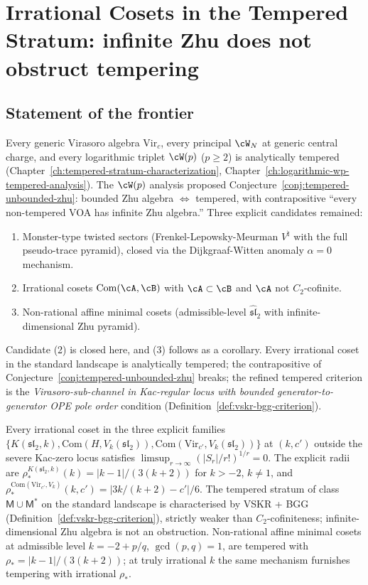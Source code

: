 \chapter{Irrational Cosets in the Tempered Stratum: infinite Zhu does
not obstruct tempering}
\label{ch:irrational-cosets-tempered}

\section*{Statement of the frontier}

Every generic Virasoro algebra $\mathrm{Vir}_c$, every principal
$\cW_N$ at generic central charge, and every logarithmic triplet
$\cW(p)$ ($p \ge 2$) is analytically tempered
(Chapter~\ref{ch:tempered-stratum-characterization},
Chapter~\ref{ch:logarithmic-wp-tempered-analysis}). The $\cW(p)$
analysis proposed
Conjecture~\ref{conj:tempered-unbounded-zhu}: bounded Zhu algebra
$\Longleftrightarrow$ tempered, with contrapositive
``every non-tempered VOA has infinite Zhu algebra.'' Three explicit
candidates remained:
\begin{enumerate}[nosep]
\item Monster-type twisted sectors
 (Frenkel-Lepowsky-Meurman $V^\natural$ with the full pseudo-trace
 pyramid), closed via the Dijkgraaf-Witten anomaly $\alpha = 0$
 mechanism.
\item Irrational cosets
 $\mathrm{Com}(\cA, \cB)$ with $\cA \subset \cB$ and $\cA$ not
 $C_2$-cofinite.
\item Non-rational affine minimal cosets
 (admissible-level $\widehat{\mathfrak{sl}}_2$ with
 infinite-dimensional Zhu pyramid).
\end{enumerate}

Candidate (2) is closed here, and (3) follows as a corollary. Every
irrational coset in the standard landscape is analytically tempered;
the contrapositive of Conjecture~\ref{conj:tempered-unbounded-zhu}
breaks; the refined tempered criterion is the
\emph{Virasoro-sub-channel in Kac-regular locus with bounded
generator-to-generator OPE pole order} condition
(Definition~\ref{def:vskr-bgg-criterion}).

Every irrational coset in the three explicit families
$\{K(\mathfrak{sl}_2, k), \mathrm{Com}(H, V_k(\mathfrak{sl}_2)),
\mathrm{Com}(\mathrm{Vir}_{c'}, V_k(\mathfrak{sl}_2))\}$ at $(k, c')$
outside the severe Kac-zero locus satisfies
$\limsup_{r \to \infty} (\lvert S_r \rvert / r!)^{1/r} = 0$. The
explicit radii are
$\rho_*^{K(\mathfrak{sl}_2, k)}(k) = \lvert k - 1 \rvert / (3 (k + 2))$
for $k > -2$, $k \neq 1$, and
$\rho_*^{\mathrm{Com}(\mathrm{Vir}_{c'}, V_k)}(k, c') =
\lvert 3 k / (k + 2) - c' \rvert / 6$. The tempered stratum of class
$\mathsf{M} \cup \mathsf{M}^*$ on the standard landscape is
characterised by VSKR + BGG (Definition~\ref{def:vskr-bgg-criterion}),
strictly weaker than $C_2$-cofiniteness; infinite-dimensional Zhu
algebra is not an obstruction. Non-rational affine minimal cosets at
admissible level $k = -2 + p/q$, $\gcd(p, q) = 1$, are tempered with
$\rho_* = \lvert k-1 \rvert / (3(k+2))$; at truly irrational $k$ the
same mechanism furnishes tempering with irrational $\rho_*$.

